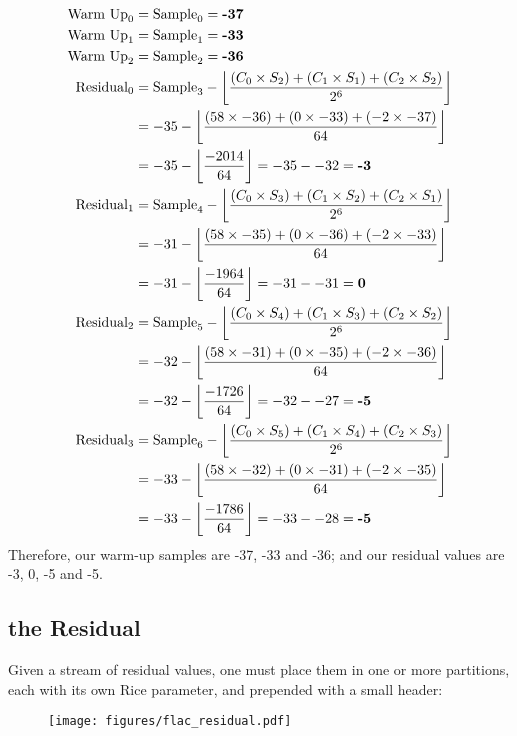 \begin{align*}
\text{Warm Up}_0 &= \text{Sample}_0 = \textbf{-37} \\
\text{Warm Up}_1 &= \text{Sample}_1 = \textbf{-33} \\
\text{Warm Up}_2 &= \text{Sample}_2 = \textbf{-36} \\
\text{Residual}_0 &= \text{Sample}_3 - \left\lfloor\frac{(C_0 \times S_2) + (C_1 \times S_1) + (C_2 \times S_2)}{2 ^ 6}\right\rfloor \\
&= -35 - \left\lfloor\frac{(58 \times -36) + (0 \times -33) + (-2 \times -37)}{64}\right\rfloor \\
&= -35 - \left\lfloor\frac{-2014}{64}\right\rfloor = -35 - -32 = \textbf{-3} \\
\text{Residual}_1 &= \text{Sample}_4 - \left\lfloor\frac{(C_0 \times S_3) + (C_1 \times S_2) + (C_2 \times S_1)}{2 ^ 6}\right\rfloor \\
&= -31 - \left\lfloor\frac{(58 \times -35) + (0 \times -36) + (-2 \times -33)}{64}\right\rfloor \\
&= -31 - \left\lfloor\frac{-1964}{64}\right\rfloor = -31 - -31 = \textbf{0} \\
\text{Residual}_2 &= \text{Sample}_5 - \left\lfloor\frac{(C_0 \times S_4) + (C_1 \times S_3) + (C_2 \times S_2)}{2 ^ 6}\right\rfloor \\
&= -32 - \left\lfloor\frac{(58 \times -31) + (0 \times -35) + (-2 \times -36)}{64}\right\rfloor \\
&= -32 - \left\lfloor\frac{-1726}{64}\right\rfloor = -32 - -27 = \textbf{-5} \\
\text{Residual}_3 &= \text{Sample}_6 - \left\lfloor\frac{(C_0 \times S_5) + (C_1 \times S_4) + (C_2 \times S_3)}{2 ^ 6}\right\rfloor \\
&= -33 - \left\lfloor\frac{(58 \times -32) + (0 \times -31) + (-2 \times -35)}{64}\right\rfloor \\
&= -33 - \left\lfloor\frac{-1786}{64}\right\rfloor = -33 - -28 = \textbf{-5} \\
\end{align*}
Therefore, our warm-up samples are -37, -33 and -36; and our
residual values are -3, 0, -5 and -5.

\clearpage

\subsection{the Residual}

Given a stream of residual values, one must place them in one or more
partitions, each with its own Rice parameter, and prepended with a
small header:
\begin{figure}[h]
\texttt{[image: figures/flac\_residual.pdf]}
\end{figure}


